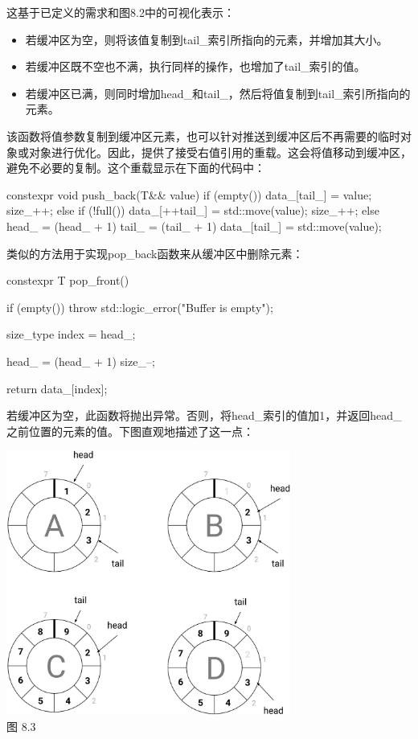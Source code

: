 这基于已定义的需求和图8.2中的可视化表示：

\begin{itemize}
  \item 若缓冲区为空，则将该值复制到tail_索引所指向的元素，并增加其大小。
  \item 若缓冲区既不空也不满，执行同样的操作，也增加了tail_索引的值。
  \item 若缓冲区已满，则同时增加head_和tail_，然后将值复制到tail_索引所指向的元素。
\end{itemize}

该函数将值参数复制到缓冲区元素，也可以针对推送到缓冲区后不再需要的临时对象或对象进行优化。因此，提供了接受右值引用的重载。这会将值移动到缓冲区，避免不必要的复制。这个重载显示在下面的代码中：

\begin{cppcode}
constexpr void push_back(T&& value)
{
	if (empty())
	{
		data_[tail_] = value;
		size_++;
	}
	else if (!full())
	{
		data_[++tail_] = std::move(value);
		size_++;
	}
	else
	{
	head_ = (head_ + 1) %
	tail_ = (tail_ + 1) %
	data_[tail_] = std::move(value);
	}
}
\end{cppcode}

类似的方法用于实现pop_back函数来从缓冲区中删除元素：

\begin{cppcode}
constexpr T pop_front()
{
	if (empty()) throw std::logic_error("Buffer is empty");
	
	size_type index = head_;
	
	head_ = (head_ + 1) %
	size_--;
	
	return data_[index];
}
\end{cppcode}

若缓冲区为空，此函数将抛出异常。否则，将head_索引的值加1，并返回head_之前位置的元素的值。下图直观地描述了这一点：

\begin{center}
\includegraphics[width=0.7\textwidth]{images/3.png}\\
图 8.3
\end{center}

